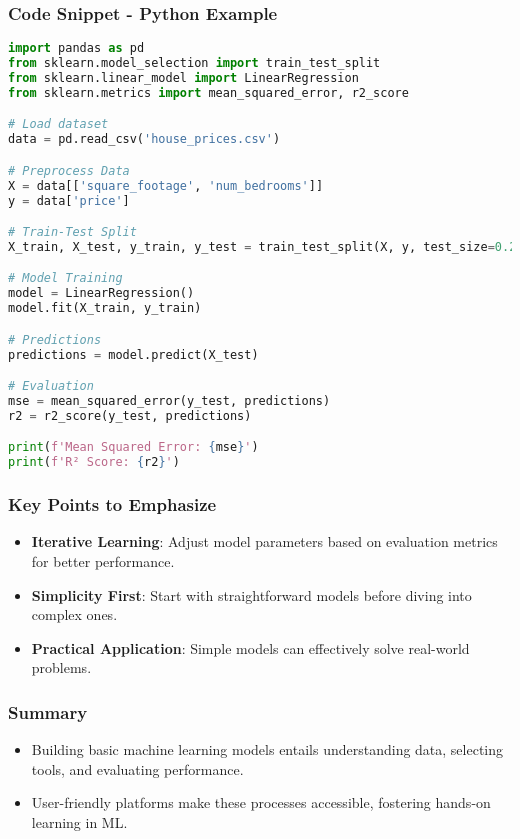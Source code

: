 \documentclass[aspectratio=169]{beamer}
\begin{document}
\begin{frame}[fragile]
    \frametitle{Code Snippet - Python Example}
    \begin{lstlisting}[language=Python]
import pandas as pd
from sklearn.model_selection import train_test_split
from sklearn.linear_model import LinearRegression
from sklearn.metrics import mean_squared_error, r2_score

# Load dataset
data = pd.read_csv('house_prices.csv')

# Preprocess Data
X = data[['square_footage', 'num_bedrooms']]
y = data['price']

# Train-Test Split
X_train, X_test, y_train, y_test = train_test_split(X, y, test_size=0.2, random_state=42)

# Model Training
model = LinearRegression()
model.fit(X_train, y_train)

# Predictions
predictions = model.predict(X_test)

# Evaluation
mse = mean_squared_error(y_test, predictions)
r2 = r2_score(y_test, predictions)

print(f'Mean Squared Error: {mse}')
print(f'R² Score: {r2}')
    \end{lstlisting}
\end{frame}

\begin{frame}
    \frametitle{Key Points to Emphasize}
    \begin{itemize}
        \item \textbf{Iterative Learning}: Adjust model parameters based on evaluation metrics for better performance.
        \item \textbf{Simplicity First}: Start with straightforward models before diving into complex ones.
        \item \textbf{Practical Application}: Simple models can effectively solve real-world problems.
    \end{itemize}
\end{frame}

\begin{frame}
    \frametitle{Summary}
    \begin{itemize}
        \item Building basic machine learning models entails understanding data, selecting tools, and evaluating performance.
        \item User-friendly platforms make these processes accessible, fostering hands-on learning in ML.
    \end{itemize}
\end{frame}
\end{document}
